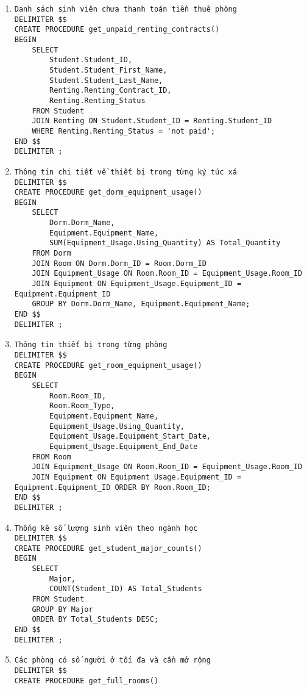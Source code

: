 \documentclass[a4paper,12pt]{article}
\begin{document}
\begin{enumerate}
\begin{verbatim}
\end{verbatim}
\item \begin{verbatim}
Danh sách sinh viên chưa thanh toán tiền thuê phòng
DELIMITER $$
CREATE PROCEDURE get_unpaid_renting_contracts()
BEGIN
    SELECT 
        Student.Student_ID,
        Student.Student_First_Name,
        Student.Student_Last_Name,
        Renting.Renting_Contract_ID,
        Renting.Renting_Status
    FROM Student
    JOIN Renting ON Student.Student_ID = Renting.Student_ID
    WHERE Renting.Renting_Status = 'not paid';
END $$
DELIMITER ;
\end{verbatim}
\item \begin{verbatim}
Thông tin chi tiết về thiết bị trong từng ký túc xá
DELIMITER $$
CREATE PROCEDURE get_dorm_equipment_usage()
BEGIN
    SELECT 
        Dorm.Dorm_Name,
        Equipment.Equipment_Name,
        SUM(Equipment_Usage.Using_Quantity) AS Total_Quantity
    FROM Dorm
    JOIN Room ON Dorm.Dorm_ID = Room.Dorm_ID
    JOIN Equipment_Usage ON Room.Room_ID = Equipment_Usage.Room_ID
    JOIN Equipment ON Equipment_Usage.Equipment_ID = Equipment.Equipment_ID
    GROUP BY Dorm.Dorm_Name, Equipment.Equipment_Name;
END $$
DELIMITER ;
\end{verbatim}
\item \begin{verbatim}
Thông tin thiết bị trong từng phòng
DELIMITER $$
CREATE PROCEDURE get_room_equipment_usage()
BEGIN
    SELECT 
        Room.Room_ID,
        Room.Room_Type,
        Equipment.Equipment_Name,
        Equipment_Usage.Using_Quantity,
        Equipment_Usage.Equipment_Start_Date,
        Equipment_Usage.Equipment_End_Date
    FROM Room
    JOIN Equipment_Usage ON Room.Room_ID = Equipment_Usage.Room_ID
    JOIN Equipment ON Equipment_Usage.Equipment_ID = Equipment.Equipment_ID ORDER BY Room.Room_ID;
END $$
DELIMITER ;
\end{verbatim}
\item \begin{verbatim}
Thống kê số lượng sinh viên theo ngành học
DELIMITER $$
CREATE PROCEDURE get_student_major_counts()
BEGIN
    SELECT 
        Major,
        COUNT(Student_ID) AS Total_Students
    FROM Student
    GROUP BY Major
    ORDER BY Total_Students DESC;
END $$
DELIMITER ;
\end{verbatim}
\item \begin{verbatim}
Các phòng có số người ở tối đa và cần mở rộng
DELIMITER $$
CREATE PROCEDURE get_full_rooms()

\end{verbatim}
\end{enumerate}
\end{document}

